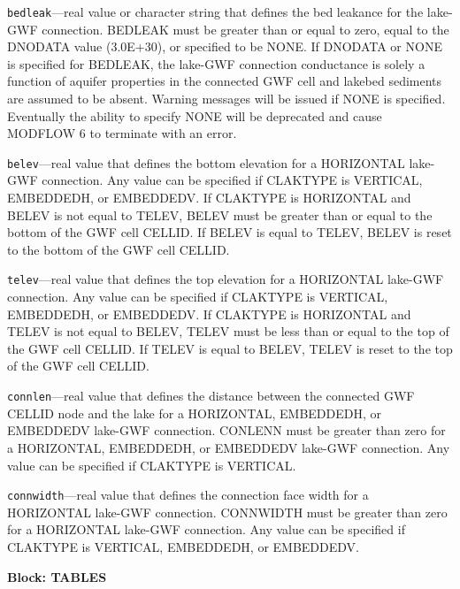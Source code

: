\begin{description}
\item \texttt{bedleak}---real value or character string that defines the bed leakance for the lake-GWF connection. BEDLEAK must be greater than or equal to zero, equal to the DNODATA value (3.0E+30), or specified to be NONE. If DNODATA or NONE is specified for BEDLEAK, the lake-GWF connection conductance is solely a function of aquifer properties in the connected GWF cell and lakebed sediments are assumed to be absent. Warning messages will be issued if NONE is specified. Eventually the ability to specify NONE will be deprecated and cause MODFLOW 6 to terminate with an error.

\item \texttt{belev}---real value that defines the bottom elevation for a HORIZONTAL lake-GWF connection. Any value can be specified if CLAKTYPE is VERTICAL, EMBEDDEDH, or EMBEDDEDV. If CLAKTYPE is HORIZONTAL and BELEV is not equal to TELEV, BELEV must be greater than or equal to the bottom of the GWF cell CELLID. If BELEV is equal to TELEV, BELEV is reset to the bottom of the GWF cell CELLID.

\item \texttt{telev}---real value that defines the top elevation for a HORIZONTAL lake-GWF connection. Any value can be specified if CLAKTYPE is VERTICAL, EMBEDDEDH, or EMBEDDEDV. If CLAKTYPE is HORIZONTAL and TELEV is not equal to BELEV, TELEV must be less than or equal to the top of the GWF cell CELLID. If TELEV is equal to BELEV, TELEV is reset to the top of the GWF cell CELLID.

\item \texttt{connlen}---real value that defines the distance between the connected GWF CELLID node and the lake for a HORIZONTAL, EMBEDDEDH, or EMBEDDEDV lake-GWF connection. CONLENN must be greater than zero for a HORIZONTAL, EMBEDDEDH, or EMBEDDEDV lake-GWF connection. Any value can be specified if CLAKTYPE is VERTICAL.

\item \texttt{connwidth}---real value that defines the connection face width for a HORIZONTAL lake-GWF connection. CONNWIDTH must be greater than zero for a HORIZONTAL lake-GWF connection. Any value can be specified if CLAKTYPE is VERTICAL, EMBEDDEDH, or EMBEDDEDV.

\end{description}
\item \textbf{Block: TABLES}

